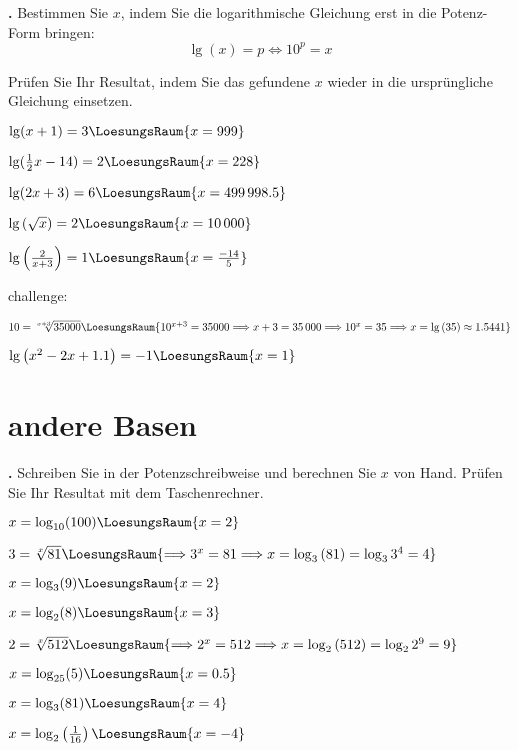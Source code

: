 \newpage

\textbf{\bbwAufgabenNummer{}.}
Bestimmen Sie $x$, indem Sie die logarithmische Gleichung erst in die
Potenz-Form bringen:
$$\lg(x) = p \Longleftrightarrow 10^p = x$$

Prüfen Sie Ihr Resultat, indem Sie das gefundene $x$ wieder in die
ursprüngliche Gleichung einsetzen.

\begin{bbwAufgabenBlock}
\item $\lg(x+1)= 3  \LoesungsRaum{x=999}$
\item $\lg(\frac12 x - 14)= 2  \LoesungsRaum{x=228}$
\item $\lg(2x+3)= 6  \LoesungsRaum{x=499\,998.5}$
\item $\lg\left(\sqrt{x}\right)= 2  \LoesungsRaum{x=10\,000}$
\item $\lg\left(\frac2{x+3}\right)=
1  \LoesungsRaum{x=\frac{-14}5}$

challenge:

\item $10 = \sqrt[x+3]{35000}   \LoesungsRaum{10^{x+3} = 35000 \Longrightarrow x+3 = 35\,000 \Longrightarrow 10^x = 35 \Longrightarrow x=\lg{}(35) \approx 1.5441}$


\item $\lg\left( x^2-2x+1.1 \right)= -1  \LoesungsRaum{x=1}$

\end{bbwAufgabenBlock}

\newpage
\section{andere Basen}

\textbf{\bbwAufgabenNummer{}.}
Schreiben Sie in der Potenzschreibweise und berechnen Sie $x$ von
Hand.
Prüfen Sie Ihr Resultat mit dem Taschenrechner.


\begin{bbwAufgabenBlock}
\item $x = \log_{10}(100)  \LoesungsRaum{x=2}$
\item $3 = \sqrt[x]{81}  \LoesungsRaum{\Longrightarrow 3^x=81 \Longrightarrow x=\log_3{}(81) = \log_3{3^4} = 4}$

\item $x = \log_3(9)  \LoesungsRaum{x=2}$
\item $x = \log_2(8)  \LoesungsRaum{x=3}$

\item $2 = \sqrt[x]{512}  \LoesungsRaum{\Longrightarrow 2^x=512 \Longrightarrow x=\log_2{}(512) = \log_2{2^9} = 9}$


\item $x = \log_{25}(5)  \LoesungsRaum{x=0.5}$
\noTRAINER{\newpage}
\item $x = \log_3(81)  \LoesungsRaum{x=4}$
\item $x = \log_2\left(\frac1{16}\right)  \LoesungsRaum{x=-4}$
\end{bbwAufgabenBlock}

